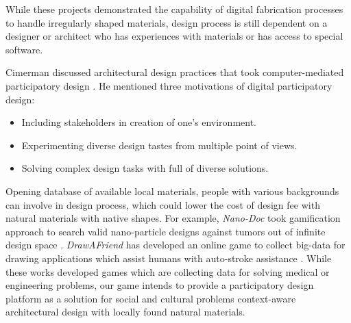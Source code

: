 While these projects demonstrated the capability of digital fabrication processes to handle irregularly shaped materials, design process is still dependent on a designer or architect who has experiences with materials or has access to special software.

Cimerman discussed architectural design practices that took computer-mediated participatory design \cite{cimerman2000participatory}.
He mentioned three motivations of digital participatory design:
\begin{itemize}
 \item{Including stakeholders in creation of one's environment.}
 \item{Experimenting diverse design tastes from multiple point of views.}
 \item{Solving complex design tasks with full of diverse solutions.}
\end{itemize}
Opening database of available local materials, people with various backgrounds can involve in design process, which could lower the cost of design fee with natural materials with native shapes.
For example, \textit{Nano-Doc} took gamification approach to search valid nano-particle designs against tumors out of infinite design space \cite{hauertcrowdsourcing}.
\textit{DrawAFriend} has developed an online game to collect big-data for drawing applications which assist humans with auto-stroke assistance \cite{limpaecher2013real}.
While these works developed games which are collecting data for solving medical or engineering problems, our game intends to provide a participatory design platform as a solution for social and cultural problems context-aware architectural design with locally found natural materials.

